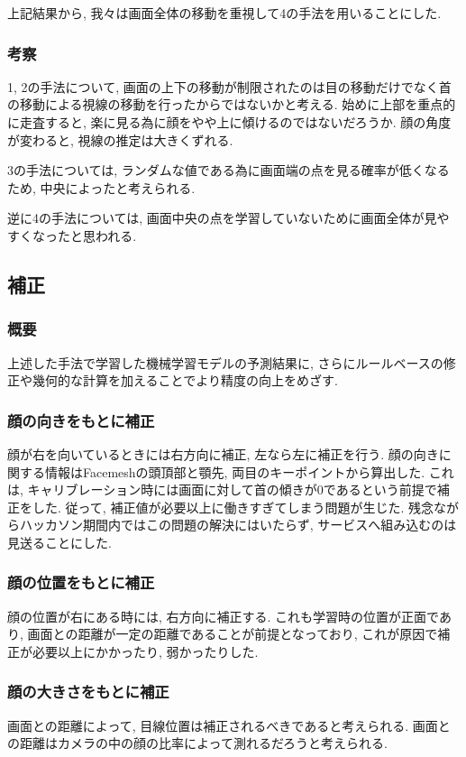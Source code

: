 \documentclass[a4paper,11pt]{jsarticle}
\begin{document}
上記結果から, 我々は画面全体の移動を重視して4の手法を用いることにした.

\subsubsection{考察}
1, 2の手法について, 画面の上下の移動が制限されたのは目の移動だけでなく首の移動による視線の移動を行ったからではないかと考える.
始めに上部を重点的に走査すると, 楽に見る為に顔をやや上に傾けるのではないだろうか. 
顔の角度が変わると, 視線の推定は大きくずれる. 

3の手法については, ランダムな値である為に画面端の点を見る確率が低くなるため, 中央によったと考えられる.

逆に4の手法については, 画面中央の点を学習していないために画面全体が見やすくなったと思われる.

\subsection{補正}
\subsubsection{概要}
上述した手法で学習した機械学習モデルの予測結果に, さらにルールベースの修正や幾何的な計算を加えることでより精度の向上をめざす.
\subsubsection{顔の向きをもとに補正}
顔が右を向いているときには右方向に補正, 左なら左に補正を行う.
顔の向きに関する情報はFacemeshの頭頂部と顎先, 両目のキーポイントから算出した.
これは, キャリブレーション時には画面に対して首の傾きが0であるという前提で補正をした.
従って, 補正値が必要以上に働きすぎてしまう問題が生じた. 
残念ながらハッカソン期間内ではこの問題の解決にはいたらず, サービスへ組み込むのは見送ることにした.

\subsubsection{顔の位置をもとに補正}
顔の位置が右にある時には, 右方向に補正する.
これも学習時の位置が正面であり, 画面との距離が一定の距離であることが前提となっており, これが原因で補正が必要以上にかかったり, 弱かったりした.

\subsubsection{顔の大きさをもとに補正}
画面との距離によって, 目線位置は補正されるべきであると考えられる.
画面との距離はカメラの中の顔の比率によって測れるだろうと考えられる.
\end{document}

